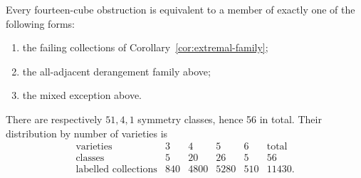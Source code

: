 \begin{theorem}\label{thm:classification14}
Every fourteen-cube obstruction is equivalent to a member of exactly one
of the following forms:
\begin{enumerate}
 \item the failing collections of Corollary~\ref{cor:extremal-family};
 \item the all-adjacent derangement family above;
 \item the mixed exception above.
\end{enumerate}
There are respectively $51,4,1$ symmetry classes, hence 56 in total.
Their distribution by number of varieties is
\[
\begin{array}{c|rrrr|r}
 \text{varieties}&3&4&5&6&\text{total}\\\hline
 \text{classes}&5&20&26&5&56\\
 \text{labelled collections}&840&4800&5280&510&11430.
\end{array}
\]
\end{theorem}

